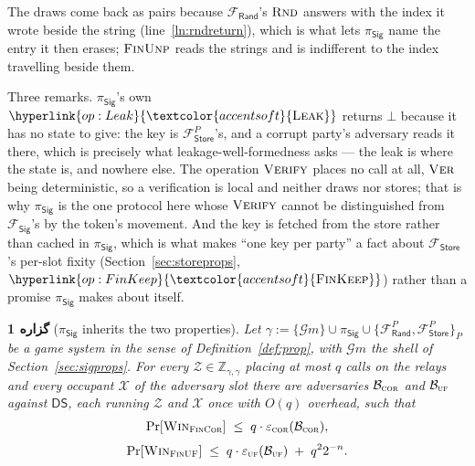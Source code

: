 \documentclass[10pt,oneside,openany]{book}
\newcommand{\Zenv}{\mathcal{Z}}
\newcommand{\ZenvSet}{\mathbb{Z}}
\newcommand{\op}[1]{\textnormal{\textsc{#1}}}
\newcommand{\opl}[1]{\hyperlink{op:#1}{\textcolor{accentsoft}{\op{#1}}}}
\newcommand{\Gm}{\mathcal{G}m}
\newcommand{\Win}{\op{Win}}
\newcommand{\Frand}{\mathcal{F}_{\mathsf{Rand}}}
\newcommand{\Fstore}{\mathcal{F}_{\mathsf{Store}}}
\newcommand{\Fsig}{\mathcal{F}_{\mathsf{Sig}}}
\newcommand{\DS}{\mathsf{DS}}
\newcommand{\psig}{\pi_{\mathsf{Sig}}}
\newcommand{\none}{\bot}
\theoremstyle{accentdef}
\theoremstyle{accentplain}
\newtheorem{proposition}[definition]{گزاره}
\begin{document}
The draws come back as pairs because $\Frand$'s $\op{Rnd}$ answers with the index it wrote
beside the string (line~\ref{ln:rndreturn}), which is what lets $\psig$ name the entry it then
erases; $\op{FinUnp}$ reads the strings and is indifferent to the index travelling beside them.

Three remarks. $\psig$'s own $\opl{Leak}$ returns $\none$ because it has no state to give: the key
is $\Fstore^{P}$'s, and a corrupt party's adversary reads it there, which is precisely what
leakage-well-formedness asks --- the leak is where the state is, and nowhere else. The operation $\op{Verify}$
places no call at all, $\op{Ver}$ being deterministic, so a verification is local and neither
draws nor stores; that is why $\psig$ is the one protocol here whose $\op{Verify}$ cannot be
distinguished from $\Fsig$'s by the token's movement. And the key is fetched from the store rather
than cached in $\psig$, which is what makes ``one key per party'' a fact about $\Fstore$'s
per-slot fixity (Section~\ref{sec:storeprops}, $\opl{FinKeep}$) rather than a promise $\psig$
makes about itself.

\begin{proposition}[$\psig$ inherits the two properties]\label{prop:psigprops}
Let $\gamma := \{\Gm\} \cup \psig \cup \{\Frand^{P},\Fstore^{P}\}_{P}$ be a game system in the
sense of Definition~\ref{def:prop}, with $\Gm$ the shell of Section~\ref{sec:sigprops}. For every
$\Zenv \in \ZenvSet_{\gamma,\gamma}$ placing at most $q$ calls on the relays and every occupant
$\mathcal{X}$ of the adversary slot there are adversaries $\mathcal{B}_{\op{cor}}$ and
$\mathcal{B}_{\op{uf}}$ against $\DS$, each running $\Zenv$ and $\mathcal{X}$ once with $O(q)$
overhead, such that
\[
  \begin{gathered}
  \Pr[\Win_{\op{FinCor}}] \;\leq\; q \cdot \varepsilon_{\op{cor}}(\mathcal{B}_{\op{cor}}) , \\[3pt]
  \Pr[\Win_{\op{FinUF}}] \;\leq\; q \cdot \varepsilon_{\op{uf}}(\mathcal{B}_{\op{uf}})
  \;+\; q^{2} 2^{-n} .
  \end{gathered}
\]
\end{proposition}
\end{document}
